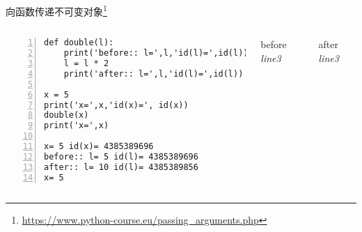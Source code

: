 \documentclass{beamer}
\begin{document}
\begin{frame}[fragile]{向函数传递不可变对象\footnote{\url{https://www.python-course.eu/passing_arguments.php}}}
\begin{columns}
\begin{Verbatim}[numbers=left,frame=single,rulecolor=\color{red}]
def double(l):
    print('before:: l=',l,'id(l)=',id(l))
    l = l * 2
    print('after:: l=',l,'id(l)=',id(l))

x = 5
print('x=',x,'id(x)=', id(x))
double(x)
print('x=',x)

x= 5 id(x)= 4385389696
before:: l= 5 id(l)= 4385389696
after:: l= 10 id(l)= 4385389856
x= 5
\end{Verbatim}
\begin{block}{before \textit{line3}}
\end{block}
\begin{block}{after \textit{line3}}
\end{block}

\end{columns}
\end{frame}
\end{document}
